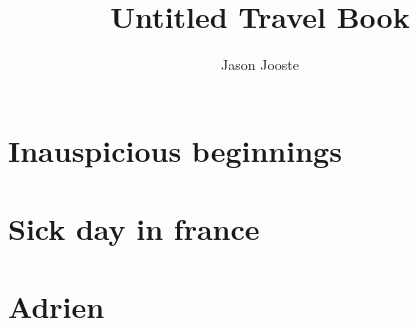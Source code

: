 \documentclass[11pt,twoside,openright]{memoir}
\title{Untitled Travel Book}
\author{Jason Jooste}
\date{}
\begin{document}
\frontmatter
\begin{titlingpage}
  \centering
  \vspace*{0.3\textheight}
  {\Huge\thetitle\par}
  \vspace{2\onelineskip}
  {\large\scshape\theauthor\par}
\end{titlingpage}

\cleardoublepage
\tableofcontents*

\mainmatter

\chapter{Inauspicious beginnings}


\chapter{Sick day in france}


\chapter{Adrien}


\backmatter
\end{document}
